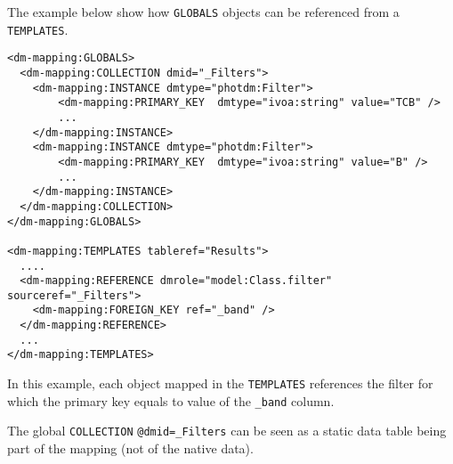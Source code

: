 The example below show how \texttt{GLOBALS} objects can be referenced from a  \texttt{TEMPLATES}. 

\begin{lstlisting}[frame=single,caption={Dynamic reference example},style=XML,basicstyle=\tiny]
<dm-mapping:GLOBALS>
  <dm-mapping:COLLECTION dmid="_Filters">
    <dm-mapping:INSTANCE dmtype="photdm:Filter">
		<dm-mapping:PRIMARY_KEY  dmtype="ivoa:string" value="TCB" />
		...
	</dm-mapping:INSTANCE>
	<dm-mapping:INSTANCE dmtype="photdm:Filter">
		<dm-mapping:PRIMARY_KEY  dmtype="ivoa:string" value="B" />
		...
	</dm-mapping:INSTANCE>
  </dm-mapping:COLLECTION>
</dm-mapping:GLOBALS>

<dm-mapping:TEMPLATES tableref="Results">
  ....
  <dm-mapping:REFERENCE	dmrole="model:Class.filter"	sourceref="_Filters">
    <dm-mapping:FOREIGN_KEY ref="_band" />
  </dm-mapping:REFERENCE>
  ...
</dm-mapping:TEMPLATES>

\end{lstlisting}  

In this example, each object mapped in the \texttt{TEMPLATES} references the filter for which the primary key equals to value of the \texttt{\_band} column.

The global \texttt{COLLECTION} \texttt{@dmid=\_Filters} can be seen as a static data table being part of the mapping (not of the native data).

